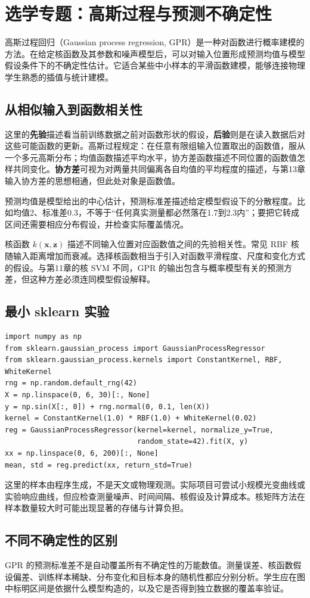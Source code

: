 \chapter{选学专题：高斯过程与预测不确定性}
高斯过程回归（Gaussian process regression, GPR）是一种对函数进行概率建模的方法。在给定核函数及其参数和噪声模型后，可以对输入位置形成预测均值与模型假设条件下的不确定性估计。它适合某些中小样本的平滑函数建模，能够连接物理学生熟悉的插值与统计建模。
\section{从相似输入到函数相关性}
这里的\textbf{先验}描述看当前训练数据之前对函数形状的假设，\textbf{后验}则是在读入数据后对这些可能函数的更新。高斯过程规定：在任意有限组输入位置取出的函数值，服从一个多元高斯分布；均值函数描述平均水平，协方差函数描述不同位置的函数值怎样共同变化。\textbf{协方差}可视为对两量共同偏离各自均值的平均程度的描述，与第13章输入协方差的思想相通，但此处对象是函数值。

预测均值是模型给出的中心估计，预测标准差描述给定模型假设下的分散程度。比如均值2、标准差0.3，不等于“任何真实测量都必然落在1.7到2.3内”；要把它转成区间还需要相应分布假设，并检查实际覆盖情况。

核函数 $k(\mathbf x,\mathbf z)$ 描述不同输入位置对应函数值之间的先验相关性。常见 RBF 核随输入距离增加而衰减。选择核函数相当于引入对函数平滑程度、尺度和变化方式的假设。与第11章的核 SVM 不同，GPR 的输出包含与概率模型有关的预测方差，但这种方差必须连同模型假设解释。
\section{最小 sklearn 实验}
\begin{lstlisting}[caption={人工生成平滑函数的高斯过程回归示例}]
import numpy as np
from sklearn.gaussian_process import GaussianProcessRegressor
from sklearn.gaussian_process.kernels import ConstantKernel, RBF, WhiteKernel
rng = np.random.default_rng(42)
X = np.linspace(0, 6, 30)[:, None]
y = np.sin(X[:, 0]) + rng.normal(0, 0.1, len(X))
kernel = ConstantKernel(1.0) * RBF(1.0) + WhiteKernel(0.02)
reg = GaussianProcessRegressor(kernel=kernel, normalize_y=True,
                               random_state=42).fit(X, y)
xx = np.linspace(0, 6, 200)[:, None]
mean, std = reg.predict(xx, return_std=True)
\end{lstlisting}
这里的样本由程序生成，不是天文或物理观测。实际项目可尝试小规模光变曲线或实验响应曲线，但应检查测量噪声、时间间隔、核假设及计算成本。核矩阵方法在样本数量较大时可能出现显著的存储与计算负担。
\section{不同不确定性的区别}
GPR 的预测标准差不是自动覆盖所有不确定性的万能数值。测量误差、核函数假设偏差、训练样本稀缺、分布变化和目标本身的随机性都应分别分析。学生应在图中标明区间是依据什么模型构造的，以及它是否得到独立数据的覆盖率验证。


